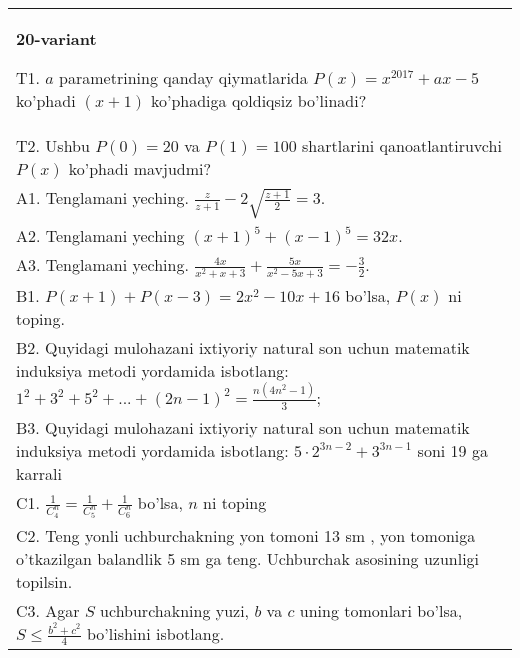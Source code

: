 \documentclass{article}
\begin{document}
\begin{tabular}{m{17cm}}
\textbf{20-variant}
\newline

T1. \(a\) parametrining qanday qiymatlarida \(P(x) = x^{2017} + ax - 5\) ko'phadi \((x + 1)\) ko'phadiga qoldiqsiz bo'linadi? \\
T2. Ushbu \(P(0) = 20\) va \(P(1) = 100\) shartlarini qanoatlantiruvchi \(P(x)\) ko'phadi mavjudmi? \\
A1. Tenglamani yeching. \(\frac{z}{z + 1} - 2\sqrt{\frac{z + 1}{2}} = 3\). \\
A2. Tenglamani yeching \((x + 1)^{5} + (x - 1)^{5} = 32x\). \\
A3. Tenglamani yeching. \(\frac{4x}{x^{2} + x + 3} + \frac{5x}{x^{2} - 5x + 3} = - \frac{3}{2}\). \\
B1. \(P(x + 1) + P(x - 3) = 2x^{2} - 10x + 16\) bo'lsa, \(P(x)\) ni toping. \\
B2. Quyidagi mulohazani ixtiyoriy natural son uchun matematik induksiya metodi yordamida isbotlang: \(1^{2} + 3^{2} + 5^{2} + ... + (2n - 1)^{2} = \frac{n\left( 4n^{2} - 1 \right)}{3}\); \\
B3. Quyidagi mulohazani ixtiyoriy natural son uchun matematik induksiya metodi yordamida isbotlang: \(5 \cdot 2^{3n - 2} + 3^{3n - 1}\) soni 19 ga karrali \\
C1. \(\frac{1}{C_{4}^{n}} = \frac{1}{C_{5}^{n}} + \frac{1}{C_{6}^{n}}\) bo'lsa, \(n\) ni toping \\
C2. Teng yonli uchburchakning yon tomoni 13 sm , yon tomoniga o'tkazilgan balandlik 5 sm ga teng. Uchburchak asosining uzunligi topilsin. \\
C3. Agar \(S\) uchburchakning yuzi, \(b\) va \(c\) uning tomonlari bo'lsa, \(S \leq \frac{b^{2} + c^{2}}{4}\) bo'lishini isbotlang. \\

\end{tabular}
\vspace{1cm}
\end{document}
